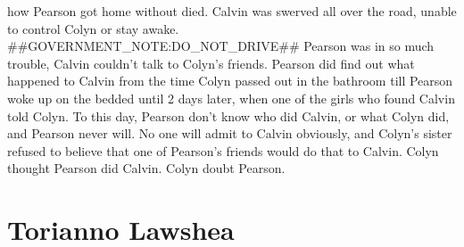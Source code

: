 \documentclass[12pt]{book}
\begin{document}
how Pearson got home without died. Calvin was swerved all over the road, unable to control Colyn or stay awake. \#\#GOVERNMENT\_NOTE:DO\_NOT\_DRIVE\#\# Pearson was in so much trouble, Calvin couldn't talk to Colyn's friends. Pearson did find out what happened to Calvin from the time Colyn passed out in the bathroom till Pearson woke up on the bedded until 2 days later, when one of the girls who found Calvin told Colyn. To this day, Pearson don't know who did Calvin, or what Colyn did, and Pearson never will. No one will admit to Calvin obviously, and Colyn's sister refused to believe that one of Pearson's friends would do that to Calvin. Colyn thought Pearson did Calvin. Colyn doubt Pearson.






\chapter{Torianno Lawshea}
\end{document}
